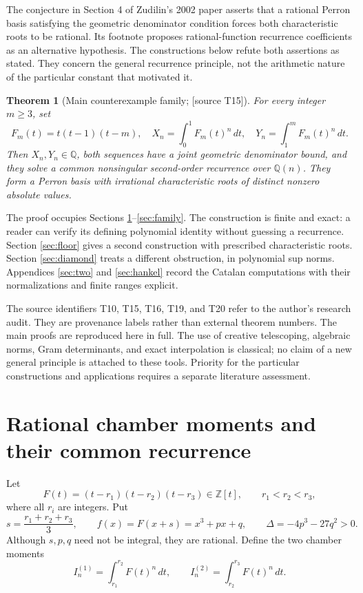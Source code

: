 \documentclass[11pt,a4paper]{article}
\newtheorem{theorem}{Theorem}[section]
\theoremstyle{definition}\newtheorem{definition}[theorem]{Definition}
\theoremstyle{remark}\newtheorem{remark}[theorem]{Remark}
\newcommand{\Q}{\mathbb Q}\newcommand{\Z}{\mathbb Z}\newcommand{\N}{\mathbb N}\newcommand{\R}{\mathbb R}\newcommand{\C}{\mathbb C}
\newcommand{\sourceT}[1]{\textup{[source T#1]}}
\begin{document}
The conjecture in Section 4 of Zudilin's 2002 paper \cite{Z02} asserts that a rational Perron basis satisfying the geometric denominator condition forces both characteristic roots to be rational. Its footnote proposes rational-function recurrence coefficients as an alternative hypothesis. The constructions below refute both assertions as stated. They concern the general recurrence principle, not the arithmetic nature of the particular constant that motivated it.

\begin{theorem}[Main counterexample family; \sourceT{15}]\label{thm:main}
For every integer $m\ge3$, set
\[
 F_m(t)=t(t-1)(t-m),\quad
 X_n=\int_0^1F_m(t)^n\,dt,\quad
 Y_n=\int_1^mF_m(t)^n\,dt.
\]
Then $X_n,Y_n\in\Q$, both sequences have a joint geometric denominator bound, and they solve a common nonsingular second-order recurrence over $\Q(n)$. They form a Perron basis with irrational characteristic roots of distinct nonzero absolute values.
\end{theorem}

The proof occupies Sections \ref{sec:cubic}--\ref{sec:family}. The construction is finite and exact: a reader can verify its defining polynomial identity without guessing a recurrence. Section \ref{sec:floor} gives a second construction with prescribed characteristic roots. Section \ref{sec:diamond} treats a different obstruction, in polynomial sup norms. Appendices \ref{sec:two} and \ref{sec:hankel} record the Catalan computations with their normalizations and finite ranges explicit.

The source identifiers T10, T15, T16, T19, and T20 refer to the author's research audit. They are provenance labels rather than external theorem numbers. The main proofs are reproduced here in full. The use of creative telescoping, algebraic norms, Gram determinants, and exact interpolation is classical; no claim of a new general principle is attached to these tools. Priority for the particular constructions and applications requires a separate literature assessment.

\section{Rational chamber moments and their common recurrence}\label{sec:cubic}
Let
\[
 F(t)=(t-r_1)(t-r_2)(t-r_3)\in\Z[t],\qquad r_1<r_2<r_3,
\]
where all $r_i$ are integers. Put
\[
 s=\frac{r_1+r_2+r_3}{3},\qquad
 f(x)=F(x+s)=x^3+px+q,\qquad
 \Delta=-4p^3-27q^2>0.
\]
Although $s,p,q$ need not be integral, they are rational. Define the two chamber moments
\[
 I_n^{(1)}=\int_{r_1}^{r_2}F(t)^n\,dt,\qquad
 I_n^{(2)}=\int_{r_2}^{r_3}F(t)^n\,dt.
\]
\end{document}
